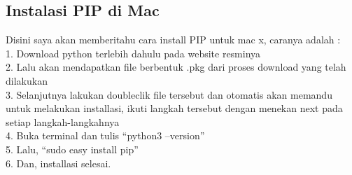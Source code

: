 \subsection{Instalasi PIP di Mac}
Disini saya akan memberitahu cara install PIP untuk mac x, caranya adalah : \\
1.	Download python terlebih dahulu pada website resminya \\
2.	Lalu akan mendapatkan file berbentuk .pkg  dari proses download yang telah dilakukan \\
3.	Selanjutnya lakukan doubleclik file tersebut dan otomatis akan memandu untuk melakukan installasi, ikuti langkah tersebut dengan menekan next pada setiap langkah-langkahnya \\
4.	Buka terminal dan tulis “python3 –version” \\
5.	Lalu, “sudo easy install pip” \\
6.	Dan, installasi selesai. \\
